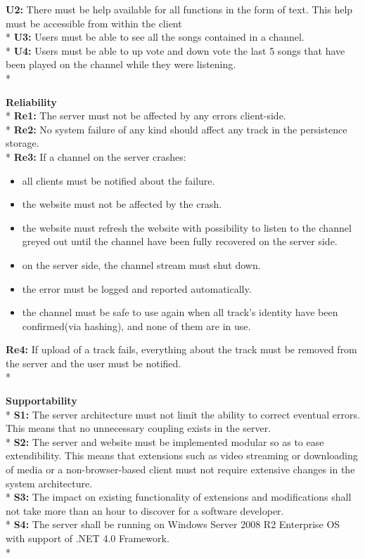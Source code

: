 \documentclass[a4paper,11pt,report]{article}
\begin{document}
\textbf{U2:} There must be help available for all functions in the form of text. This help must be accessible from within the client \\*
\textbf{U3:} Users must be able to see all the songs contained in a channel. \\*
\textbf{U4:} Users must be able to up vote and down vote the last 5 songs that have been played on the channel while they were listening. \\*

\textbf{Reliability} \\*
\textbf{Re1:} The server must not be affected by any errors client-side. \\*
\textbf{Re2:} No system failure of any kind should affect any track in the persistence storage. \\*
\textbf{Re3:} If a channel on the server crashes:
\begin{itemize}
\item all clients must be notified about the failure.
\item the website must not be affected by the crash.
\item the website must refresh the website with possibility to listen to the channel greyed out until the channel have been fully recovered on the server side.
\item on the server side, the channel stream must shut down.
\item the error must be logged and reported automatically. 
\item the channel must be safe to use again when all track's identity have been confirmed(via hashing), and none of them are in use.
\end{itemize}
\textbf{Re4:} If upload of a track fails, everything about the track must be removed from the server and the user must be notified. \\*

\textbf{Supportability} \\*
\textbf{S1:} The server architecture must not limit the ability to correct eventual errors. This means that no unnecessary coupling exists in the server. \\*
\textbf{S2:} The server and website must be implemented modular so as to ease extendibility. This means that extensions such as video streaming or downloading of media or a non-browser-based client must not require extensive changes in the system architecture.\\*
\textbf{S3:} The impact on existing functionality of extensions and modifications shall not take more than an hour to discover for a software developer. \\*
\textbf{S4:} The server shall be running on Windows Server 2008 R2 Enterprise OS with support of .NET 4.0 Framework.\\*
\end{document}
